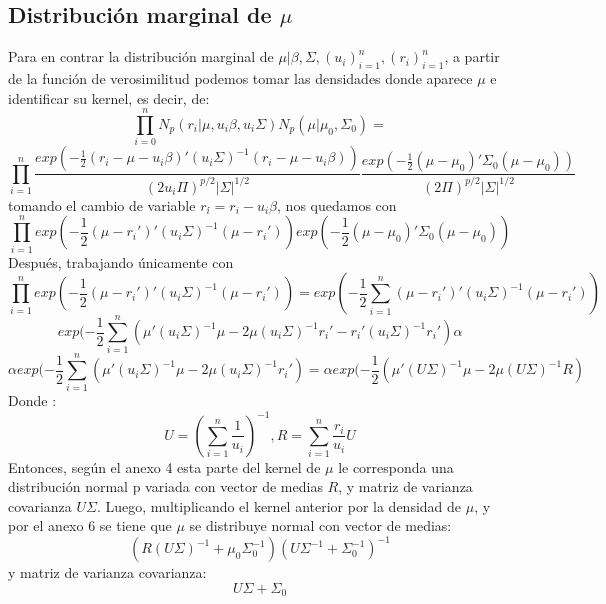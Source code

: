 \documentclass[11pt]{book}
\begin{document}
\subsection*{Distribución marginal de $\mu$}
Para en contrar la distribución marginal de $\mu|\beta,\Sigma,(u_{i})_{i=1}^{n},(r_{i})_{i=1}^{n}$, a partir de la función de verosimilitud podemos tomar las densidades donde aparece $\mu$ e identificar su kernel, es decir, de: 
\begin{equation*}
\prod_{i=0}^{n}N_{p}(r_{i}|\mu,u_{i}\beta,u_{i}\Sigma)N_{p}(\mu|\mu_{0},\Sigma_{0})=
\end{equation*}
\begin{equation*}
\prod_{i=1}^{n}\dfrac{exp(-\frac{1}{2}(r_{i}-\mu-u_{i}\beta)'(u_{i}\Sigma)^{-1}(r_{i}-\mu-u_{i}\beta))}{(2u_{i}\Pi)^{p/2}|\Sigma|^{1/2}}\dfrac{exp(-\frac{1}{2}(\mu-\mu_{0})'\Sigma_{0}(\mu-\mu_{0}))}{(2\Pi)^{p/2}|\Sigma|^{1/2}}
\end{equation*}
tomando el cambio de variable  $r_{i}\acute{}=r_{i}-u_{i}\beta$, nos quedamos con 
\begin{equation*}
\prod_{i=1}^{n}exp(-\frac{1}{2}(\mu-r_{i}')'(u_{i}\Sigma)^{-1}(\mu-r_{i}'))exp(-\dfrac{1}{2}(\mu-\mu_{0})'\Sigma_{0}(\mu-\mu_{0}))
\end{equation*}
Después, trabajando únicamente con
\begin{equation*}
\prod_{i=1}^{n}exp(-\frac{1}{2}(\mu-r_{i}')'(u_{i}\Sigma)^{-1}(\mu-r_{i}'))=exp(-\frac{1}{2}\sum_{i=1}^{n}(\mu-r_{i}')'(u_{i}\Sigma)^{-1}(\mu-r_{i}'))
\end{equation*}
\begin{equation*}
exp(-\frac{1}{2}\sum_{i=1}^{n}(\mu'(u_{i}\Sigma)^{-1}\mu  -2\mu(u_{i}\Sigma)^{-1}r_{i}' -r_{i}'(u_{i}\Sigma)^{-1}r_{i}' )\alpha 
\end{equation*}
\begin{equation*}
\alpha exp(-\frac{1}{2}\sum_{i=1}^{n}(\mu'(u_{i}\Sigma)^{-1}\mu  -2\mu(u_{i}\Sigma)^{-1}r_{i}')=
\alpha exp(-\frac{1}{2}(\mu'(U\Sigma)^{-1}\mu  -2\mu(U\Sigma)^{-1}R)
\end{equation*}
Donde : 
\begin{equation*}
U=(\sum_{i=1}^{n}\dfrac{1}{u_{i}})^{-1}, R= \sum_{i=1}^{n}\dfrac{r_{i}}{u_{i}}U
\end{equation*}
Entonces, según el anexo 4 esta parte del kernel de $\mu$ le corresponda una distribución normal p variada con vector de medias $R$, y matriz de varianza covarianza $U\Sigma$. Luego, multiplicando el kernel anterior por la densidad de $\mu$, y por el anexo 6 se tiene que $\mu$ se distribuye normal con vector de medias:
\begin{equation*}
(R(U\Sigma)^{-1}+\mu_{0}\Sigma_{0}^{-1})(U\Sigma^{-1}+\Sigma_{0}^{-1})^{-1}
\end{equation*}
 y matriz de varianza covarianza:
 \begin{equation*}
 U\Sigma+\Sigma_{0}
 \end{equation*}
\end{document}
